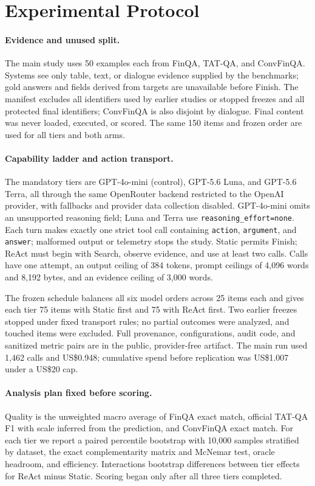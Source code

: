 \section{Experimental Protocol}
\label{sec:protocol}

\paragraph{Evidence and unused split.}
The main study uses 50 examples each from FinQA, TAT-QA, and ConvFinQA. Systems
see only table, text, or dialogue evidence supplied by the benchmarks; gold
answers and fields derived from targets are unavailable before Finish. The manifest excludes all
identifiers used by earlier studies or stopped freezes and all protected final
identifiers; ConvFinQA is also disjoint by dialogue. Final content was never
loaded, executed, or scored. The same 150 items and frozen order are used for
all tiers and both arms.

\paragraph{Capability ladder and action transport.}
The mandatory tiers are GPT-4o-mini (control), GPT-5.6 Luna, and GPT-5.6 Terra,
all through the same OpenRouter backend restricted to the OpenAI provider, with
fallbacks and provider data collection disabled. GPT-4o-mini omits an
unsupported reasoning field; Luna and Terra use
\texttt{reasoning\_effort=none}. Each turn makes exactly one strict tool call
containing \texttt{action}, \texttt{argument}, and \texttt{answer}; malformed
output or telemetry stops the study. Static permits Finish; ReAct must begin
with Search, observe evidence, and use at least two calls. Calls have one
attempt, an output ceiling of 384 tokens, prompt ceilings of 4,096 words and
8,192 bytes, and an evidence ceiling of 3,000 words.

The frozen schedule balances all six model orders across 25 items each and gives
each tier 75 items with Static first and 75 with ReAct first. Two earlier freezes stopped under fixed
transport rules; no partial outcomes were analyzed, and touched items were
excluded. Full provenance, configurations, audit code, and sanitized metric
pairs are in the public, provider-free artifact. The main run used 1,462 calls and
US\$0.948; cumulative spend before replication was US\$1.007 under a US\$20 cap.

\paragraph{Analysis plan fixed before scoring.}
Quality is the unweighted macro average of FinQA exact match, official TAT-QA
F1 with scale inferred from the prediction, and ConvFinQA exact match. For each
tier we report a paired percentile bootstrap with 10,000 samples stratified by
dataset, the exact complementarity matrix and McNemar test, oracle headroom,
and efficiency. Interactions bootstrap differences between tier effects for
ReAct minus Static. Scoring began only after all three tiers completed.

